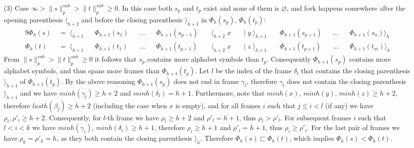 \documentclass[AMA,STIX1COL]{WileyNJD-v2}
\newcommand{\Xl}{\langle}
\newcommand{\Xr}{\rangle}
\newcommand{\snorm}[2]{\|{#1}\|^{sub}_{#2}}
\begin{document}
\begin{proofEnd}
\begin{itemize}[itemsep=0.5em, topsep=0.5em]
    \item[(3)]
        Case $\infty > \snorm{s}{p} > \snorm{t}{p} \geq 0$.
        In this case both $s_p$ and $t_p$ exist and none of them is $\varnothing$,
        and fork happens somewhere after the opening parenthesis $\Xl_{h+2}$
        and before the closing parenthesis $\Xr_{h+1}$ in $\Phi_{h}(s_p)$, $\Phi_{h}(t_p)$:
        \begin{alignat*}{9}
            \Phi_{h}(s) &\;=\; \Xl_{h+1} &&\Phi_{h+1}(s_1) &&\dots &&\Phi_{h+1}(s_{p-1}) &&\; \Xl_{h+2} \; x
                &&\;\big|\; y \; \Xr_{h+1} \; &&\Phi_{h+1}(s_{p+1}) &&\dots &&\Phi_{h+1}(s_n) \Xr_{h} \\[-0.5em]
            \Phi_{h}(t) &\;=\; \Xl_{h+1} &&\Phi_{h+1}(t_1) &&\dots &&\Phi_{h+1}(t_{p-1}) &&\; \Xl_{h+2} \; x
                &&\;\big|\; z \; \Xr_{h+1} \; &&\Phi_{h+1}(t_{p+1}) &&\dots &&\Phi_{h+1}(t_m) \Xr_{h}
        \end{alignat*}
        From $\snorm{s}{p} > \snorm{t}{p} \geq 0$ it follows that
        $s_p$ contains more alphabet symbols than $t_p$.
        Consequently $\Phi_{h+1}(s_p)$ contains more alphabet symbols, and thus spans more frames than $\Phi_{h+1}(t_p)$.
        Let $l$ be the index of the frame $\delta_l$ that contains the closing parenthesis $\Xr_{h+1}$ of $\Phi_{h+1}(t_p)$.
        By the above reasoning $\Phi_{h+1}(s_p)$ does not end in frame $\gamma_l$,
        therefore $\gamma_l$ does not contain the closing parenthesis $\Xr_{h+1}$
        and we have $minh (\gamma_l) \geq h+2$ and $minh (\delta_l) = h+1$.
        Furthermore, note that $minh(x)$, $minh(y)$, $minh(z) \geq h + 2$,
        therefore $lasth(\beta_j) \geq h+2$ (including the case when $x$ is empty),
        and for all frames $i$ such that $j \leq i < l$ (if any) we have $\rho_i, \rho'_i \geq h+2$.
        Consequently, for $l$-th frame we have $\rho_l \geq h+2$ and $\rho'_l = h + 1$, thus $\rho_l > \rho'_l$.
        For subsequent frames $i$ such that $l < i < k$ we have $minh(\gamma_i)$, $minh(\delta_i) \geq h + 1$,
        therefore $\rho_i \geq h+1$ and $\rho'_i = h + 1$, thus $\rho_i \geq \rho'_i$.
        For the last pair of frames we have $\rho_k = \rho'_k = h$, as they both contain the closing parenthesis $\Xr_{h}$.
        Therefore $\Phi_{h}(s) \sqsubset \Phi_{h}(t)$,
        which implies $\Phi_{h}(s) < \Phi_{h}(t)$.
    \end{itemize}
\end{proofEnd}
\end{document}
